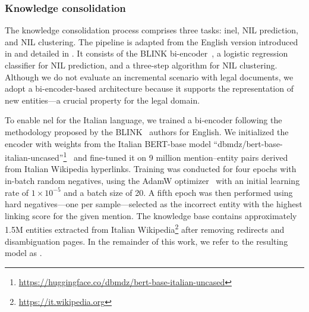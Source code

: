 \subsubsection{Knowledge consolidation}
\label{sec:claw_consolidation}
The knowledge consolidation process comprises three tasks: \ac{inel}, NIL prediction, and NIL clustering.  
The pipeline is adapted from the English version introduced in \textcite{ijckg2022} and detailed in . It consists of the BLINK bi-encoder~\cite{blink}, a logistic regression classifier for NIL prediction, and a three-step algorithm for NIL clustering.  
Although we do not evaluate an incremental scenario with legal documents, we adopt a bi-encoder-based architecture because it supports the representation of new entities---a crucial property for the legal domain.

To enable \ac{nel} for the Italian language, we trained a bi-encoder following the methodology proposed by the BLINK~\cite{blink} authors for English.  
We initialized the encoder with weights from the Italian BERT-base model ``dbmdz/bert-base-italian-uncased''\footnote{\url{https://huggingface.co/dbmdz/bert-base-italian-uncased}}~\cite{stefan_schweter_2020_4263142} and fine-tuned it on 9 million mention--entity pairs derived from Italian Wikipedia hyperlinks.  
Training was conducted for four epochs with in-batch random negatives, using the AdamW optimizer~\cite{loshchilov2018decoupled} with an initial learning rate of $1 \times 10^{-5}$ and a batch size of 20.  
A fifth epoch was then performed using hard negatives---one per sample---selected as the incorrect entity with the highest linking score for the given mention.  
The knowledge base contains approximately 1.5M entities extracted from Italian Wikipedia\footnote{\url{https://it.wikipedia.org}} after removing redirects and disambiguation pages.  
In the remainder of this work, we refer to the resulting model as \blinkita.

